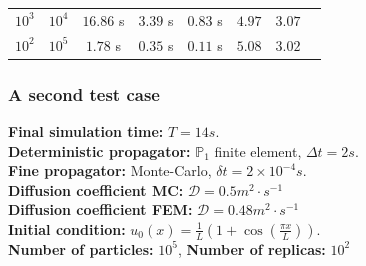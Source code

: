 \documentclass[10 pt]{beamer}
\begin{document}
\begin{frame}
\begin{table}[]
\begin{tabular}{|c|c|c|c|c|c|c|l}
$10^3$                                                            & $10^4$                                                        & $16.86$ s                                                            & $3.39$ s                                                                             & $0.83$ s                                                                            & $4.97$                                                        & $3.07$                                                       &                      \\ \cline{1-7}
$10^2$                                                            & $10^5$                                                        & $1.78$ s                                                            & $0.35$ s                                                                             & $0.11$ s                                                                            & $5.08$                                                        & $3.02$                                                       &                      \\ \cline{1-7}
\end{tabular}
\end{table}
\end{frame}
%
\begin{frame}
  \frametitle{A second test case}
  \textbf{Final simulation time:} $T=14 s$.
\\
\vspace{0.3 cm}
\textbf{Deterministic propagator:} $\mathbb{P}_1$ finite element, $\Delta t = 2 s$.
\\
\vspace{0.3 cm}
\textbf{Fine propagator:} Monte-Carlo, $\delta t = 2 \times 10^{-4} s$.
\\
\vspace{0.3 cm}
\textbf{Diffusion coefficient MC:} $\mathcal{D} = 0.5 m^2 \cdot s^{-1}$
\\
\vspace{0.3 cm}
\textbf{Diffusion coefficient FEM:} $\mathcal{D}=0.48 m^2 \cdot s^{-1}$
\\
\vspace{0.3 cm}
\textbf{Initial condition:} $u_0(x)=\frac{1}{L} \left(1 + \cos(\frac{\pi x}{L}) \right)$.
\\
\vspace{0.3 cm}
\textbf{Number of particles:} $10^5$, \textbf{Number of replicas:} $10^2$
\end{frame}
%
\end{document}
